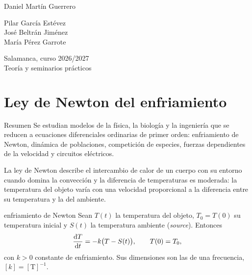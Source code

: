 \documentclass[11pt,twoside]{article}
\begin{document}
\begin{titlepage}
\begin{minipage}[t]{0.32\textwidth}
{\small Daniel Martín Guerrero}
\end{minipage}\hfill
\begin{minipage}[t]{0.32\textwidth}\centering
{\color{acc}\footnotesize{}}\par\vspace{2pt}
{\small Pilar García Estévez\\ José Beltrán Jiménez\\ María Pérez Garrote}
\end{minipage}\hfill
\begin{minipage}[t]{0.32\textwidth}\raggedleft
{\color{acc}\footnotesize{}}\par\vspace{2pt}
{\small Salamanca, curso 2026/2027}\\[1pt]
{\footnotesize\color{muted}Teoría y seminarios prácticos}
\end{minipage}
\end{titlepage}

\setcounter{page}{2}
{\hypersetup{linkcolor=fg}\tableofcontents}
\clearpage

\section{Ley de Newton del enfriamiento}\label{sec:newton}

\begin{motivacion}{Resumen}
Se estudian modelos de la física, la biología y la ingeniería que se reducen a ecuaciones diferenciales ordinarias de
primer orden: enfriamiento de Newton, dinámica de poblaciones, competición de especies, fuerzas dependientes de la
velocidad y circuitos eléctricos.
\end{motivacion}

La ley de Newton describe el intercambio de calor de un cuerpo con su entorno cuando domina la convección y la diferencia
de temperaturas es moderada: la temperatura del objeto varía con una velocidad proporcional a la diferencia entre su
temperatura y la del ambiente.

\begin{modelo}{enfriamiento de Newton}
Sean $T(t)$ la temperatura del objeto, $T_0=T(0)$ su temperatura inicial y $S(t)$ la temperatura ambiente (\emph{source}).
Entonces
\begin{equation}\label{eq:newton}
\frac{\mathrm{d}T}{\mathrm{d}t}=-k\big(T-S(t)\big),\qquad T(0)=T_0,
\end{equation}
con $k>0$ constante de enfriamiento. Sus dimensiones son las de una frecuencia, $[k]=[\mathrm T]^{-1}$.
\end{modelo}
\end{document}
